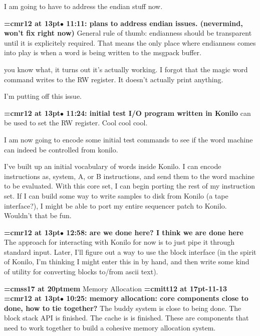 I am going to have to address the endian stuff now.
\par

{\smallskip\noindent\bf\font\titlefont=cmr12 at 13pt\titlefont $\bullet$ 11:11: plans to address endian issues. (nevermind, won't fix right now)}\smallskip
General rule of thumb: endianness should be transparent until it is explicitely required. That means the only place where endianness comes into play is when a word is being written to the msgpack buffer.
\par

you know what, it turns out it's actually working. I forgot that the magic word command writes to the RW register. It doesn't actually print anything.
\par

I'm putting off this issue.
\par

{\smallskip\noindent\bf\font\titlefont=cmr12 at 13pt\titlefont $\bullet$ 11:24: initial test I/O program written in Konilo} can be used to set the RW register. Cool cool cool.
\par

I am now going to encode some initial test commands to see if the word machine can indeed be controlled from konilo.
\par

I've built up an initial vocabulary of words inside Konilo. I can encode instructions as, system, A, or B instructions, and send them to the word machine to be evaluated. With this core set, I can begin porting the rest of my instruction set. If I can build some way to write samples to disk from Konilo (a tape interface?), I might be able to port my entire sequencer patch to Konilo. Wouldn't that be fun.
\par

{\smallskip\noindent\bf\font\titlefont=cmr12 at 13pt\titlefont $\bullet$ 12:58: are we done here? I think we are done here}\smallskip
The approach for interacting with Konilo for now is to just pipe it through standard input. Later, I'll figure out a way to use the block interface (in the spirit of Konilo, I'm thinking I might enter this in by hand, and then write some kind of utility for converting blocks to/from ascii text).
\par

{\medskip\noindent\bf\font\titlefont=cmss17 at 20pt\titlefont mem}\medskip
Memory Allocation
{\medskip\noindent\bf\font\titlefont=cmitt12 at 17pt-11-13}\medskip
{\smallskip\noindent\bf\font\titlefont=cmr12 at 13pt\titlefont $\bullet$ 10:25: memory allocation: core components close to done, how to tie together?}\smallskip
The buddy system is close to being done. The block stack API is finished. The cache is is finished. These are components that need to work together to build a cohesive memory allocation system.
\par

